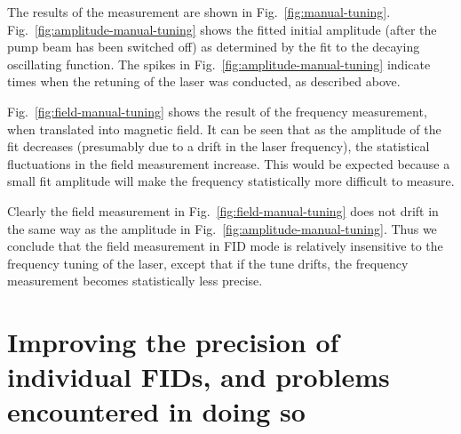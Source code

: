 \begin{itemize}
The results of the measurement are shown in
Fig.~\ref{fig:manual-tuning}.  Fig.~\ref{fig:amplitude-manual-tuning}
shows the fitted initial amplitude (after the pump beam has been
switched off) as determined by the fit to the decaying oscillating
function.  The spikes in Fig.~\ref{fig:amplitude-manual-tuning}
indicate times when the retuning of the laser was conducted, as
described above.

Fig.~\ref{fig:field-manual-tuning} shows the result of the frequency
measurement, when translated into magnetic field.  It can be seen that
as the amplitude of the fit decreases (presumably due to a drift in
the laser frequency), the statistical fluctuations in the field
measurement increase.  This would be expected because a small fit
amplitude will make the frequency statistically more difficult to
measure.

Clearly the field measurement in Fig.~\ref{fig:field-manual-tuning}
does not drift in the same way as the amplitude in
Fig.~\ref{fig:amplitude-manual-tuning}.  Thus we conclude that the
field measurement in FID mode is relatively insensitive to the
frequency tuning of the laser, except that if the tune drifts, the
frequency measurement becomes statistically less precise.


\end{itemize}




\section{Improving the precision of individual FIDs, and problems encountered in doing so \label{sec:reference-frequency}}

